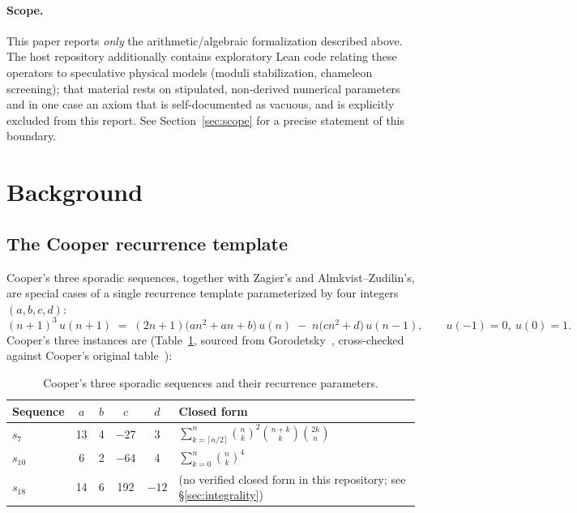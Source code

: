 \documentclass[11pt]{article}
\begin{document}
\paragraph{Scope.} This paper reports \emph{only} the arithmetic/algebraic
formalization described above. The host repository additionally contains
exploratory Lean code relating these operators to speculative physical
models (moduli stabilization, chameleon screening); that material rests on
stipulated, non-derived numerical parameters and in one case an axiom that is
self-documented as vacuous, and is explicitly excluded from this report. See
Section~\ref{sec:scope} for a precise statement of this boundary.

\section{Background}

\subsection{The Cooper recurrence template}
\label{sec:background-template}

Cooper's three sporadic sequences, together with Zagier's and
Almkvist--Zudilin's, are special cases of a single recurrence template
parameterized by four integers $(a,b,c,d)$:
\begin{equation}
  \label{eq:cooper-recurrence}
  (n+1)^3\, u(n+1) \;=\; (2n+1)\bigl(a n^2 + a n + b\bigr)\, u(n)
    \;-\; n\bigl(c n^2 + d\bigr)\, u(n-1), \qquad u(-1)=0,\ u(0)=1.
\end{equation}
Cooper's three instances are (Table~\ref{tab:params}, sourced from
Gorodetsky~\cite{Gorodetsky2023}, cross-checked against Cooper's original
table~\cite{Cooper2012}):

\begin{table}[h]
\centering
\begin{tabular}{lcccc l}
\toprule
Sequence & $a$ & $b$ & $c$ & $d$ & Closed form \\
\midrule
$s_7$ & 13 & 4 & $-27$ & 3 & $\sum_{k=\lceil n/2\rceil}^{n} \binom{n}{k}^2\binom{n+k}{k}\binom{2k}{n}$ \\
$s_{10}$ & 6 & 2 & $-64$ & 4 & $\sum_{k=0}^{n} \binom{n}{k}^4$ \\
$s_{18}$ & 14 & 6 & 192 & $-12$ & (no verified closed form in this repository; see \S\ref{sec:integrality}) \\
\bottomrule
\end{tabular}
\caption{Cooper's three sporadic sequences and their recurrence parameters.}
\label{tab:params}
\end{table}
\end{document}
